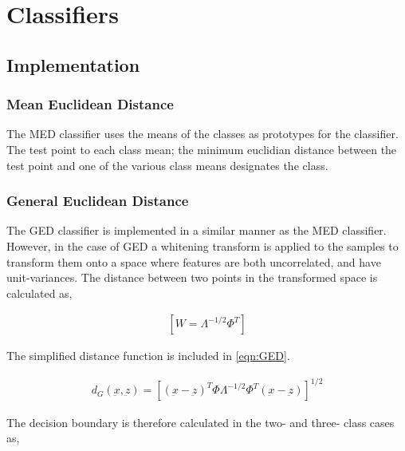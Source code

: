 \section{Classifiers}

\subsection{Implementation}

\subsubsection{Mean Euclidean Distance}

The MED classifier uses the means of the classes as prototypes for the classifier. The test point to each class mean; the minimum euclidian distance between the test point and one of the various class means designates the class.

\subsubsection{General Euclidean Distance}
The GED classifier is implemented in a similar manner as the MED classifier. However, in the case of GED a whitening transform is applied to the samples to transform them onto a space where features are both uncorrelated, and have unit-variances. The distance between two points in the transformed space is calculated as,


\begin{eqnarray}
\label{eqn:GED-whitening}
\left [ W=\Lambda^{-1/2}\Phi^{T}  \right ]
\end{eqnarray}



The simplified distance function is included in \ref{eqn:GED}.

\begin{eqnarray}
\label{eqn:GED}
{d}_{G}(\underbar{x},\underbar{z}) = {\left [ (\underbar{x}-\underbar{z})^{T}\Phi\Lambda^{-1/2}\Phi^{T}(\underbar{x}-\underbar{z}) \right ]}^{1/2}
\end{eqnarray}


The decision boundary is therefore calculated in the two- and three- class cases as,

